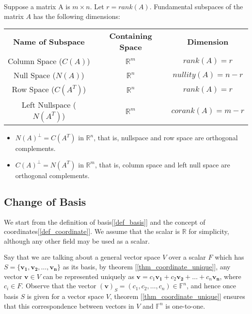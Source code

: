 \documentclass{report}
\begin{document}
	\begin{thm}
		Suppose a matrix A is $m \times n$. Let $r=rank(A)$. Fundamental subspaces of the matrix $A$ has the following dimensions:
		
		\begin{tabular}{ccc}
			\textbf{Name of Subspace} & \textbf{Containing Space} & \textbf{Dimension} \\
			Column Space ($C(A)$)             & $\mathbb{R}^m$            & $rank(A)=r$        \\
			Null Space ($N(A)$)               & $\mathbb{R}^n$            & $nullity(A)=n-r$   \\
			Row Space ($C(A^T)$)              & $\mathbb{R}^n$            & $rank(A)=r$        \\
			Left Nullspace ($N(A^T)$)         & $\mathbb{R}^m$            & $corank(A)=m-r$   
		\end{tabular}
	\end{thm}
	
	\begin{thm}
		\begin{itemize}
			\item $N(A)^\perp=C(A^T)$ in $\mathbb{R}^n$, that is, nullspace and row space are orthogonal complements.
			\item $C(A)^\perp=N(A^T)$ in $\mathbb{R}^m$, that is, column space and left null space are orthogonal complements.
		\end{itemize}
	\end{thm}
	
	\subsection{Change of Basis}
	We start from the definition of basis[\ref{def_basis}] and the concept of coordinates[\ref{def_coordinate}]. We assume that the scalar is $\mathbb{R}$ for simplicity, although any other field may be used as a scalar.
	
	Say that we are talking about a general vector space $V$ over a scalar $F$ which has $S=\{\bm{v_1},\bm{v_2},\dots,\bm{v_n}\}$ as its basis, by theorem [\ref{thm_coordinate_unique}], any vector $\bm{v}\in V$ can be represented uniquely as $\bm{v}=c_1\bm{v_1}+c_2\bm{v_2}+\dots+c_n\bm{v_n}$, where $c_i \in F$. Observe that the vector $(\bm{v})_S=(c_1,c_2,\dots,c_n) \in \mathbb{F}^n$, and hence once basis $S$ is given for a vector space $V$, theorem [\ref{thm_coordinate_unique}] ensures that this correspondence between vectors in $V$ and $\mathbb{F}^n$ is one-to-one.
	
\end{document}

